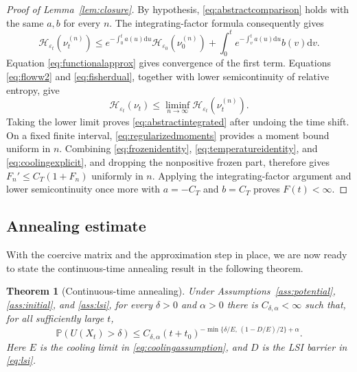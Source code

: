 \documentclass[11pt]{article}
\newtheorem{theorem}{Theorem}[section]
\theoremstyle{definition}
\newcommand{\dd}{\mathrm d}
\newcommand{\cH}{\mathcal H}
\newcommand{\eps}{\varepsilon}
\begin{document}
\begin{proof}[Proof of Lemma~\ref{lem:closure}]
By hypothesis, \eqref{eq:abstractcomparison} holds with the same $a,b$ for
every $n$. The integrating-factor formula consequently gives
\[
 \cH_{\eps_t}\left(\nu_t^{(n)}\right)
 \leq e^{-\int_0^t a(u)\dd u}\cH_{\eps_0}\left(\nu_0^{(n)}\right)
 +\int_0^t e^{-\int_v^t a(u)\dd u}b(v)\dd v.
\]
Equation \eqref{eq:functionalapprox} gives convergence of the first term.
Equations \eqref{eq:floww2} and \eqref{eq:fisherdual}, together with lower
semicontinuity of relative entropy, give
\[
 \cH_{\eps_t}(\nu_t)\leq
 \liminf_{n\to\infty}\cH_{\eps_t}\left(\nu_t^{(n)}\right).
\]
Taking the lower limit proves \eqref{eq:abstractintegrated} after undoing the
time shift. On a fixed finite interval, \eqref{eq:regularizedmoments} provides
a moment bound uniform in $n$. Combining \eqref{eq:frozenidentity},
\eqref{eq:temperatureidentity}, and \eqref{eq:coolingexplicit}, and dropping
the nonpositive frozen part, therefore gives
$F_n'\leq C_T(1+F_n)$ uniformly in $n$.
Applying the integrating-factor argument and lower semicontinuity once more
with $a=-C_T$ and $b=C_T$ proves $F(t)<\infty$.
\end{proof}


\subsection{Annealing estimate}

With the coercive matrix and the approximation step in place, we are now ready to state the
continuous-time annealing result in the following theorem.

\begin{theorem}[Continuous-time annealing]\label{thm:main}
Under Assumptions~\ref{ass:potential}, \ref{ass:initial}, and \ref{ass:lsi}, for every
$\delta>0$ and $\alpha>0$ there is $C_{\delta,\alpha}<\infty$ such that, for
all sufficiently large $t$,
\begin{equation}\label{eq:mainrate}
 \mathbb P\left(U(X_t)>\delta\right)
 \leq C_{\delta,\alpha}(t+t_0)^{-\min\{\delta/E,\,(1-D/E)/2\}+\alpha}.
\end{equation}
Here $E$ is the cooling limit in \eqref{eq:coolingassumption}, and $D$ is the
LSI barrier in \eqref{eq:lsi}.
\end{theorem}
\end{document}
